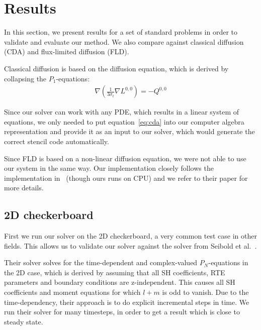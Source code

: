 \section{Results}
\label{sec:results}

In this section, we present results for a set of standard problems in order to validate and evaluate our method. We also compare against classical diffusion (CDA) and flux-limited diffusion (FLD).

Classical diffusion is based on the diffusion equation, which is derived by collapsing the $P_1$-equations:
\begin{align} 
\nabla\left(\frac{1}{3\sigma_t}\nabla L^{0,0}\right)  = -Q^{0,0}
\label{eq:cda}
\end{align}

Since our solver can work with any PDE, which results in a linear system of equations, we only needed to put equation~\ref{eq:cda} into our computer algebra representation and provide it as an input to our solver, which would generate the correct stencil code automatically.

Since FLD is based on a non-linear diffusion equation, we were not able to use our system in the same way. Our implementation closely follows the implementation in~\cite{Koerner14} (though ours runs on CPU) and we refer to their paper for more details.

\subsection{2D checkerboard}

First we run our solver on the 2D checkerboard, a very common test case in other fields. This allows us to validate our solver against the solver from Seibold et al.~\cite{Seibold14}.

Their solver solves for the time-dependent and complex-valued $P_N$-equations in the 2D case, which is derived by assuming that all SH coefficients, RTE parameters and boundary conditions are z-independent. This causes all SH coefficients and moment equations for which $l+m$ is odd to vanish. Due to the time-dependency, their approach is to do explicit incremental steps in time. We run their solver for many timesteps, in order to get a result which is close to steady state.


